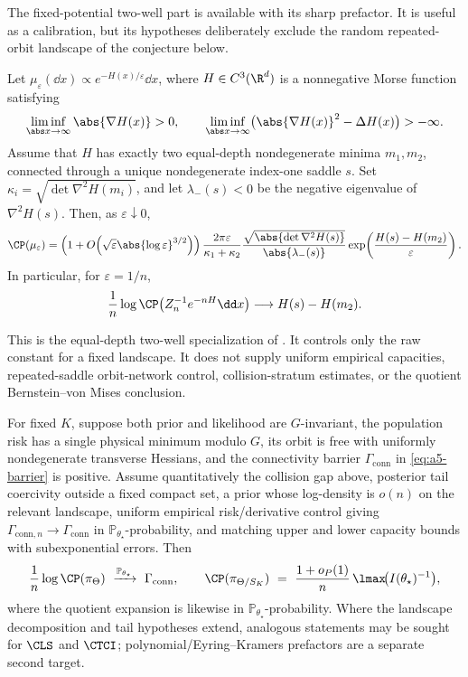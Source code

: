 \documentclass[../../main.tex]{subfiles}
\begin{document}
The fixed-potential two-well part is available with its sharp prefactor.  It is useful as a
calibration, but its hypotheses deliberately exclude the random repeated-orbit landscape of the
conjecture below.

\begin{theorem}
\label{thm:a5-two-well-eyring-kramers}
Let $\mu_\varepsilon(\dd x)\propto e^{-H(x)/\varepsilon}\dd x$, where
$H\in C^3(\R^d)$ is a nonnegative Morse function satisfying
\[
 \liminf_{\abs x\to\infty}\abs{\nabla H(x)}>0,
 \qquad
 \liminf_{\abs x\to\infty}
 \bigl(\abs{\nabla H(x)}^2-\Delta H(x)\bigr)>-\infty.
\]
Assume that $H$ has exactly two equal-depth nondegenerate minima $m_1,m_2$, connected through a
unique nondegenerate index-one saddle $s$.  Set
$\kappa_i=\sqrt{\det\nabla^2H(m_i)}$, and let $\lambda_-(s)<0$ be the negative eigenvalue of
$\nabla^2H(s)$.  Then, as $\varepsilon\downarrow0$,
\[
 \CP(\mu_\varepsilon)
 =\left(1+O\!\left(\sqrt\varepsilon\abs{\log\varepsilon}^{3/2}\right)\right)
 \frac{2\pi\varepsilon}{\kappa_1+\kappa_2}
 \frac{\sqrt{\abs{\det\nabla^2H(s)}}}{\abs{\lambda_-(s)}}
 \exp\!\left(\frac{H(s)-H(m_2)}{\varepsilon}\right).
\]
In particular, for $\varepsilon=1/n$,
\[
 \frac1n\log\CP\!\left(Z_n^{-1}e^{-nH}\dd x\right)
 \longrightarrow H(s)-H(m_2).
\]
\end{theorem}

\noindent This is the equal-depth two-well specialization of
\cite[Corollaries~2.15 and 2.18]{MenzSchlichting2014}.  It controls only the raw constant for a
fixed landscape.  It does not supply uniform empirical capacities, repeated-saddle orbit-network
control, collision-stratum estimates, or the quotient Bernstein--von Mises conclusion.

\begin{conjecture}
\label{conj:a5-metastable}
For fixed $K$, suppose both prior and likelihood are $G$-invariant, the population risk has a
single physical minimum modulo $G$, its orbit is free with uniformly nondegenerate transverse
Hessians, and the connectivity barrier $\Gamma_{\mathrm{conn}}$ in \eqref{eq:a5-barrier} is
positive. Assume quantitatively the
collision gap above, posterior tail coercivity outside a fixed compact set, a prior whose
log-density is $o(n)$ on the relevant landscape, uniform empirical risk/derivative control giving
$\Gamma_{\mathrm{conn},n}\to\Gamma_{\mathrm{conn}}$ in
$\mathbb P_{\theta_\star}$-probability, and matching upper and lower
capacity bounds with subexponential errors. Then
\[
  \frac1n\log\CP(\pi_\Theta)\ \xrightarrow{\mathbb P_{\theta_\star}}\ \Gamma_{\mathrm{conn}},
  \qquad
  \CP(\pi_{\Theta/S_K})\ =\ \frac{1+o_P(1)}{n}\,\lmax\!\big(I(\theta_\star)^{-1}\big),
\]
where the quotient expansion is likewise in $\mathbb P_{\theta_\star}$-probability. Where the
landscape decomposition and tail hypotheses extend, analogous statements may be sought for
$\CLS$ and $\CTCI$; polynomial/Eyring--Kramers prefactors are a separate second target.
\end{conjecture}
\end{document}
